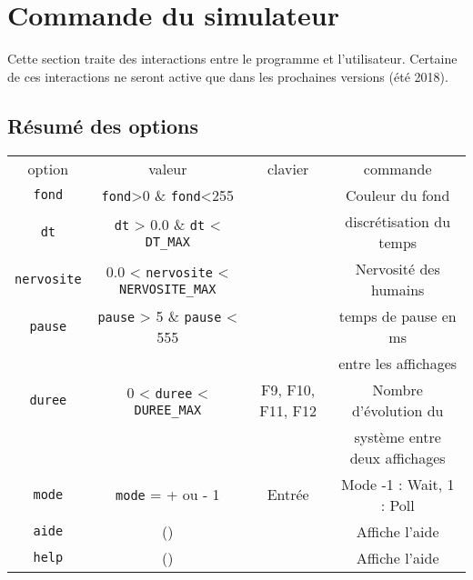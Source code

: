 \section{Commande du simulateur}
%
Cette section traite des interactions entre le programme et l'utilisateur. Certaine de ces interactions ne seront active que dans les prochaines versions (été 2018).
%
\subsection{Résumé des options}
\begin{center}
\begin{tabular}{cccc}
option & valeur & clavier & commande \\
\texttt{fond} & \texttt{fond}>0 \& \texttt{fond}<255 &  & Couleur du fond \\
\texttt{dt} & \texttt{dt} > 0.0 \& \texttt{dt} < \texttt{DT\_MAX} &  & discrétisation du temps \\
\texttt{nervosite} & 0.0 < \texttt{nervosite} < \texttt{NERVOSITE\_MAX} &  & Nervosité des humains \\%
\texttt{pause} & \texttt{pause} > 5 \& \texttt{pause} < 555 &  & temps de pause en ms \\
 &  &  & entre les affichages \\
\texttt{duree} & 0 < \texttt{duree} < \texttt{DUREE\_MAX} & {\sf F9}, {\sf F10}, {\sf F11}, {\sf F12} & Nombre d'évolution du \\
 &  &  & système entre deux affichages \\
\texttt{mode} & \texttt{mode} = + ou - 1 & {\sf Entrée} & Mode -1 : Wait, 1 : Poll \\
\texttt{aide} & () &  & Affiche l'aide \\
\texttt{help} & () &  & Affiche l'aide \\
\end{tabular}
\end{center}
%
